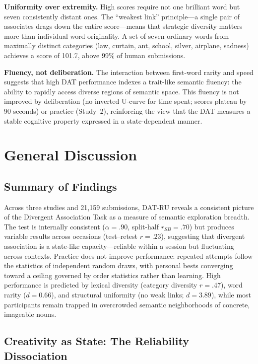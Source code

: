 \documentclass[12pt]{article}
\begin{document}
\textbf{Uniformity over extremity.} High scores require not one brilliant word but seven consistently distant ones. The ``weakest link'' principle---a single pair of associates drags down the entire score---means that strategic diversity matters more than individual word originality. A set of seven ordinary words from maximally distinct categories (law, curtain, ant, school, silver, airplane, sadness) achieves a score of 101.7, above 99\% of human submissions.

\textbf{Fluency, not deliberation.} The interaction between first-word rarity and speed suggests that high DAT performance indexes a trait-like semantic fluency: the ability to rapidly access diverse regions of semantic space. This fluency is not improved by deliberation (no inverted U-curve for time spent; scores plateau by 90 seconds) or practice (Study~2), reinforcing the view that the DAT measures a stable cognitive property expressed in a state-dependent manner.

\section{General Discussion}

\subsection{Summary of Findings}

Across three studies and 21,159 submissions, DAT-RU reveals a consistent picture of the Divergent Association Task as a measure of semantic exploration breadth. The test is internally consistent ($\alpha = .90$, split-half $r_{SB} = .70$) but produces variable results across occasions (test--retest $r = .23$), suggesting that divergent association is a state-like capacity---reliable within a session but fluctuating across contexts. Practice does not improve performance: repeated attempts follow the statistics of independent random draws, with personal bests converging toward a ceiling governed by order statistics rather than learning. High performance is predicted by lexical diversity (category diversity $r = .47$), word rarity ($d = 0.66$), and structural uniformity (no weak links; $d = 3.89$), while most participants remain trapped in overcrowded semantic neighborhoods of concrete, imageable nouns.

\subsection{Creativity as State: The Reliability Dissociation}
\end{document}
